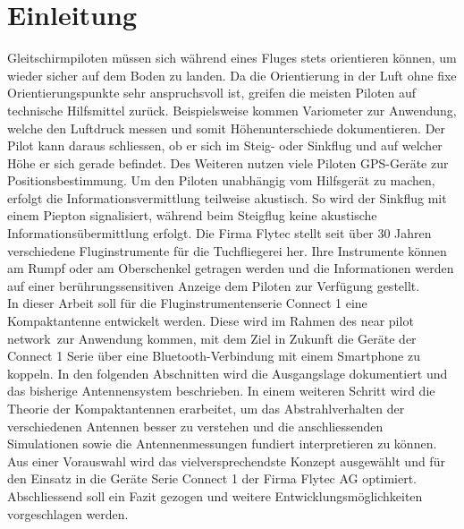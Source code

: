 \newpage
\section{Einleitung}
Gleitschirmpiloten müssen sich während eines Fluges stets orientieren können, um wieder sicher auf dem Boden zu landen. Da die Orientierung in der Luft ohne fixe Orientierungspunkte sehr anspruchsvoll ist, greifen die meisten Piloten auf technische Hilfsmittel zurück. Beispielsweise kommen Variometer zur Anwendung, welche den Luftdruck messen und somit Höhenunterschiede dokumentieren. Der Pilot kann daraus schliessen, ob er sich im Steig- oder Sinkflug  und auf welcher Höhe er sich gerade befindet. Des Weiteren nutzen viele Piloten GPS-Geräte zur Positionsbestimmung. Um den Piloten unabhängig vom Hilfsgerät zu machen, erfolgt die Informationsvermittlung teilweise akustisch. So wird der Sinkflug  mit einem Piepton signalisiert, während beim Steigflug keine akustische Informationsübermittlung erfolgt. Die Firma Flytec stellt seit über 30 Jahren verschiedene Fluginstrumente für die Tuchfliegerei her. Ihre Instrumente können am Rumpf oder am Oberschenkel getragen werden und die Informationen werden auf einer berührungssensitiven Anzeige dem Piloten zur Verfügung gestellt.\\

In dieser Arbeit soll für die Fluginstrumentenserie \glqq Connect 1 \grqq eine Kompaktantenne entwickelt werden. Diese wird im Rahmen des \glqq near pilot network\grqq \ zur Anwendung kommen, mit dem Ziel in Zukunft die Geräte der \glqq Connect 1 \grqq Serie über eine Bluetooth-Verbindung mit einem Smartphone zu koppeln. In den folgenden Abschnitten wird die Ausgangslage dokumentiert und das bisherige Antennensystem beschrieben. In einem weiteren Schritt wird die Theorie der Kompaktantennen erarbeitet, um das Abstrahlverhalten der verschiedenen Antennen besser zu verstehen und die anschliessenden Simulationen sowie die Antennenmessungen fundiert interpretieren zu können. Aus einer Vorauswahl wird das vielversprechendste Konzept ausgewählt und für den Einsatz in die Geräte Serie \glqq Connect 1 \grqq der Firma Flytec AG optimiert. Abschliessend soll ein Fazit gezogen und weitere Entwicklungsmöglichkeiten vorgeschlagen werden.

